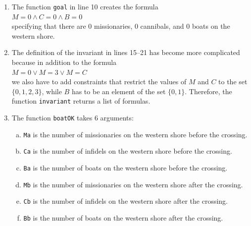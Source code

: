 \begin{enumerate}
      Note that we have to use the \texttt{Z3} method \texttt{mkAnd} to form the conjunction of the conditions.
      The method takes an arbitrary number of arguments.  The constraint solver \texttt{Z3} also provides the
      methods \texttt{mkOr} and \texttt{mkImplies}.  The method \texttt{mkOr} computes the disjunction of its
      arguments, while the method call $\texttt{mkImplies}(A, B)$ represents the formula $A \rightarrow B$.
\item The function \texttt{goal} in line 10 creates the formula
      \\[0.2cm]
      \hspace*{1.3cm}
      $M = 0 \wedge C = 0 \wedge B = 0$
      \\[0.2cm]
      specifying that there are 0 missionaries, 0 cannibals, and 0 boats on the western shore.
\item The definition of the invariant in lines 15--21 has become more complicated because in addition to the
      formula 
      \\[0.2cm]
      \hspace*{1.3cm}
      $M = 0 \vee M = 3 \vee M = C$
      \\[0.2cm]
      we also have to add constraints that restrict the values of $M$ and $C$ to the set $\{0, 1, 2, 3\}$,
      while $B$ has to be an element of the set $\{0,1\}$.  Therefore, the function \texttt{invariant} returns a list
      of formulas.
\item The function \texttt{boatOK} takes 6 arguments:
      \begin{enumerate}[(a)]
      \item \texttt{Ma} is the number of missionaries on the western shore before the crossing.
      \item \texttt{Ca} is the number of infidels on the western shore before the crossing.
      \item \texttt{Ba} is the number of boats on the western shore before the crossing. 
      \item \texttt{Mb} is the number of missionaries on the western shore after the crossing.
      \item \texttt{Cb} is the number of infidels on the western shore after the crossing.
      \item \texttt{Bb} is the number of boats on the western shore after the crossing.
      \end{enumerate}


\end{enumerate}
